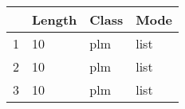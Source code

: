 \begin{table}[ht]
\centering
\begin{tabular}{rlll}
  \hline
 & Length & Class & Mode \\ 
  \hline
1 & 10 & plm & list \\ 
  2 & 10 & plm & list \\ 
  3 & 10 & plm & list \\ 
   \hline
\end{tabular}
\end{table}
